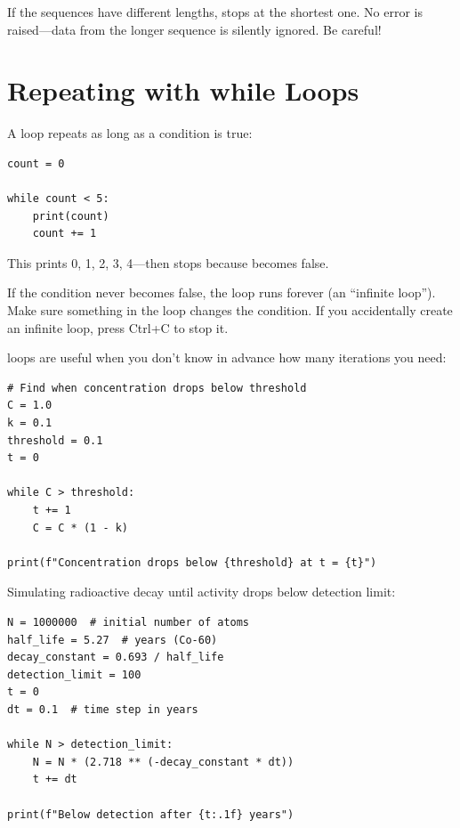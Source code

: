 \begin{warning}
If the sequences have different lengths,  stops at the shortest one. No error is raised---data from the longer sequence is silently ignored. Be careful!
\end{warning}

\section{Repeating with while Loops}
\label{sec:while}

A  loop repeats as long as a condition is true:

\begin{lstlisting}
count = 0

while count < 5:
    print(count)
    count += 1
\end{lstlisting}

This prints 0, 1, 2, 3, 4---then stops because  becomes false.

\begin{warning}
If the condition never becomes false, the loop runs forever (an ``infinite loop''). Make sure something in the loop changes the condition. If you accidentally create an infinite loop, press Ctrl+C to stop it.
\end{warning}

 loops are useful when you don't know in advance how many iterations you need:

\begin{lstlisting}
# Find when concentration drops below threshold
C = 1.0
k = 0.1
threshold = 0.1
t = 0

while C > threshold:
    t += 1
    C = C * (1 - k)

print(f"Concentration drops below {threshold} at t = {t}")
\end{lstlisting}

\begin{labexample}
Simulating radioactive decay until activity drops below detection limit:

\begin{lstlisting}
N = 1000000  # initial number of atoms
half_life = 5.27  # years (Co-60)
decay_constant = 0.693 / half_life
detection_limit = 100
t = 0
dt = 0.1  # time step in years

while N > detection_limit:
    N = N * (2.718 ** (-decay_constant * dt))
    t += dt

print(f"Below detection after {t:.1f} years")
\end{lstlisting}
\end{labexample}

